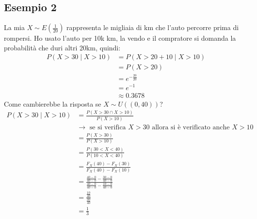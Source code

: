\documentclass[11pt]{report}
\begin{document}
\subsection{Esempio 2}
La mia $X \sim E \left( \frac{1}{20} \right)$ rappresenta le migliaia di km che l'auto percorre prima di rompersi. Ho usato l'auto per 10k km, la vendo e il compratore si domanda la probabilità che duri altri 20km, quindi:
\begin{equation}
    \begin{split}
        P(X > 30 \mid X > 10) & = P(X > 20+10 \mid X > 10)\\
        & = P(X > 20)\\
        & = e^{-\frac{20}{20}}\\
        & = e^{-1}\\
        & \approx 0.3678
    \end{split}
\end{equation}
Come cambierebbe la risposta se $X \sim U((0,40))$?
\begin{equation}
    \begin{split}
        P(X > 30 \mid X > 10) & = \frac{P(X>30 \cap X>10)}{P(X>10)}\\
        & \rightarrow \text{ se si verifica } X > 30 \text{ allora si è verificato anche } X > 10\\
        & = \frac{P(X>30)}{P(X>10)}\\
        & = \frac{P(30<X<40)}{P(10<X<40)}\\
        & = \frac{F_X(40) - F_X(30)}{F_X(40) - F_X(10)}\\
        & = \frac{\frac{40-0}{40-0} - \frac{30-0}{40-0}}{\frac{40-0}{40-0} - \frac{10-0}{40-0}}\\
        & = \frac{\frac{10}{40}}{\frac{30}{40}}\\
        & = \frac{1}{3}\\
    \end{split}
\end{equation}
\end{document}
